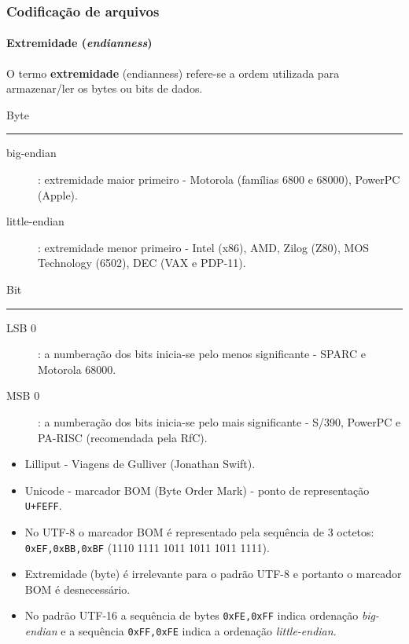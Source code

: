\begin{frame}[allowframebreaks]
\frametitle{Codificação de arquivos}
\framesubtitle{Extremidade (\textit{endianness})}
  O termo \textbf{extremidade} (endianness) refere-se a ordem utilizada para armazenar/ler os bytes ou bits de dados.

  Byte 
  \hrule
  \begin{description}
  \item[big-endian]: extremidade maior primeiro -  Motorola (famílias 6800 e 68000), PowerPC (Apple).
  \item[little-endian]: extremidade menor primeiro - Intel (x86), AMD, Zilog (Z80), MOS Technology (6502), DEC (VAX e PDP-11).
  \end{description}

  Bit
  \hrule
  \begin{description}
  \item[LSB 0]: a numberação dos bits inicia-se pelo menos significante - SPARC e Motorola 68000.
  \item[MSB 0]: a numberação dos bits inicia-se pelo mais significante - S/390, PowerPC e PA-RISC (recomendada pela RfC).
  \end{description}

  \framebreak
  \begin{itemize}
  \item Lilliput - Viagens de Gulliver (Jonathan Swift).
  \item Unicode - marcador BOM (Byte Order Mark) - ponto de representação \texttt{U+FEFF}.
  \item No UTF-8 o marcador BOM é representado pela sequência de 3 octetos: \texttt{0xEF,0xBB,0xBF} (1110 1111 1011 1011 1011 1111).
  \item Extremidade (byte) é irrelevante para o padrão UTF-8 e portanto o marcador BOM é desnecessário.
  \item No padrão UTF-16 a sequência de bytes \texttt{0xFE,0xFF} indica ordenação \textit{big-endian} e a sequência \texttt{0xFF,0xFE}
        indica a ordenação \textit{little-endian}.
  \end{itemize}

\end{frame}


